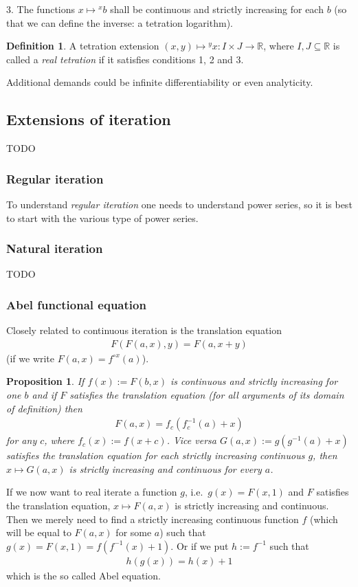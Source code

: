 \documentclass[12pt]{article}
\newtheorem{proposition}{Proposition}
\theoremstyle{definition}
\newtheorem{definition}{Definition}
\newcommand{\R}{\mathbb{R}}
\newcommand{\tet}[2]{{{}^{#2}{#1}}}
\begin{document}
3. The functions $x\mapsto \tet{b}{x}$ shall be continuous and
strictly increasing for each $b$ (so that we can define the inverse: a
tetration logarithm).

\begin{definition}
  A tetration extension $(x,y)\mapsto \tet{x}{y}\colon I\times
  J\to\R$, where $I,J\subseteq\R$ is called a {\em real tetration} if
  it satisfies conditions 1, 2 and 3.
\end{definition}
Additional demands could be infinite differentiability or even
analyticity. 

\subsection{Extensions of iteration}
TODO

\subsubsection{Regular iteration}
To understand {\it regular iteration} one needs to understand power series, so it is best to start with the various type of power series. 


\subsubsection{Natural iteration}
TODO

\subsubsection{Abel functional equation}
Closely related to continuous iteration is the translation equation
\begin{align*}
  F(F(a,x),y)=F(a,x+y)
\end{align*}
(if we write $F(a,x) = f^{\circ x}(a)$).
\begin{proposition}
  If $f(x):= F(b,x)$ is continuous and strictly increasing for
  one $b$ and if $F$ satisfies the translation equation (for all
  arguments of its domain of definition) then 
  \begin{align}
    F(a,x)=f_c(f_c^{-1}(a)+x)\label{translation abel}
  \end{align}
  for any $c$, where $f_c(x):=f(x+c)$. Vice versa
  $G(a,x):=g(g^{-1}(a)+x)$ satisfies the translation equation 
  for each strictly increasing continuous $g$, then $x\mapsto G(a,x)$ is
  strictly increasing and continuous for every $a$.
\end{proposition}
If we now want to real iterate a function $g$, i.e.\ $g(x)=F(x,1)$ and
  $F$ satisfies the translation equation, $x\mapsto F(a,x)$ is strictly
  increasing and continuous. Then we merely need to find a strictly
  increasing continuous function $f$ (which will be equal to $F(a,x)$
  for some $a$) such that $g(x)=F(x,1)=f(f^{-1}(x)+1)$. Or if we put
  $h:=f^{-1}$ such that
  \begin{align*}
    h(g(x))=h(x)+1
  \end{align*}
  which is the so called Abel equation.
\end{document}
